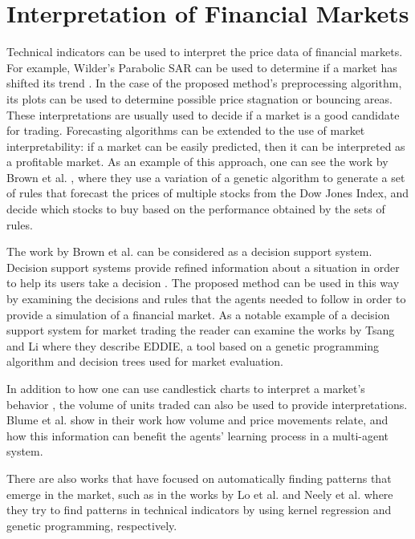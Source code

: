 \section{Interpretation of Financial Markets}
\label{section:interpretation-of-financial-markets}

Technical indicators can be used to interpret the price data of financial
markets. For example, Wilder's Parabolic SAR can be used to determine if a
market has shifted its trend \cite{Wilder1978}. In the case of the proposed
method's preprocessing algorithm, its plots can be used to determine possible
price stagnation or bouncing areas. These interpretations are usually used to
decide if a market is a good candidate for trading. Forecasting algorithms can
be extended to the use of market interpretability: if a market can be easily
predicted, then it can be interpreted as a profitable market. As an example of
this approach, one can see the work by Brown et al. \cite{Brown2013}, where they
use a variation of a genetic algorithm to generate a set of rules that forecast
the prices of multiple stocks from the Dow Jones Index, and decide which stocks
to buy based on the performance obtained by the sets of rules.

The work by Brown et al. can be considered as a decision support
system. Decision support systems provide refined information about a situation
in order to help its users take a decision \cite{Keen1980}. The proposed method
can be used in this way by examining the decisions and rules that the agents
needed to follow in order to provide a simulation of a financial market. As a
notable example of a decision support system for market trading the reader can
examine the works by Tsang and Li \cite{Tsang2004} \cite{tsang1998eddie} where
they describe EDDIE, a tool based on a genetic programming algorithm and
decision trees used for market evaluation.

In addition to how one can use candlestick charts to interpret a market's
behavior \cite{Nison1991}, the volume of units traded can also be used to
provide interpretations. Blume et al. \cite{Blume1994} show in their work how
volume and price movements relate, and how this information can benefit the
agents' learning process in a multi-agent system.

There are also works that have focused on automatically finding patterns that
emerge in the market, such as in the works by Lo et al. \cite{Lo2000} and Neely
et al. \cite{Neely1997} where they try to find patterns in technical indicators
by using kernel regression and genetic programming, respectively.

